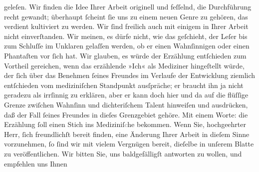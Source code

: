 \begin{ledgroupsized}[t]{13cm}
               geleſen. Wir finden die Idee Ihrer Arbeit originell und feſſelnd, die Durchführung recht gewandt; überhaupt
               ſcheint ſie uns zu einem neuen Genre zu gehören, das verdient kultiviert zu
               werden.\pend
           \pstart
           Wir ſind freilich auch mit einigem in Ihrer Arbeit nicht {\pb}einverſtanden.
               Wir meinen, es dürfe nicht, wie das geſchieht, der Leſer bis zum Schluſſe im Unklaren
               gelaſſen werden, ob er einen Wahnſinnigen oder einen Phantaſten vor ſich hat. Wir
               glauben, es würde der Erzählung entſchieden zum Vortheil gereichen, wenn das erzählende »Ich« als
               Mediziner hingeſtellt würde, der ſich über das Benehmen ſeines Freundes im Verlaufe
               der Entwicklung ziemlich entſchieden vom mediziniſchen Standpunkt ausſpräche; er
               braucht ihn ja nicht geradezu als irrſinnig zu erklären, aber er kann doch hier und
               da auf die flüſſige Grenze zwiſchen Wahnſinn und dichteriſchem Talent hinweiſen und
               ausdrücken, daß {\pb}der Fall ſeines Freundes in dieſes
               Grenzgebiet gehöre. Mit einem Worte: die Erzählung ſoll einen Stich ins
                  Mediziniſ\textcolor{gray}{c}he bekommen.\pend
           \pstart
           Wenn Sie, hochgeehrter Herr, ſich freundlichſt bereit finden, eine Änderung Ihrer Arbeit in dieſem Sinne
               vorzunehmen, ſo ſind wir mit vielem Vergnügen bereit, dieſelbe in unſerem Blatte zu veröffentlichen.\pend
           \pstart
           Wir bitten Sie, uns baldgefälligſt antworten zu wollen, und empfehlen {\pb}uns Ihnen\pend

\end{ledgroupsized}
